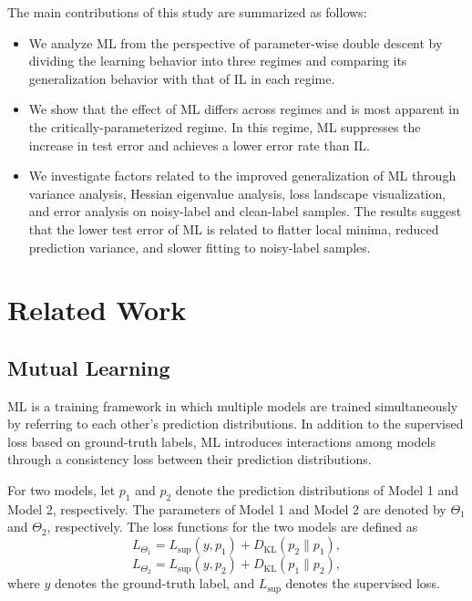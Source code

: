 \documentclass[dvipdfmx]{nolta}
\begin{document}
The main contributions of this study are summarized as follows:
\begin{itemize}
\item We analyze ML from the perspective of parameter-wise double descent by dividing the learning behavior into three regimes and comparing its generalization behavior with that of IL in each regime.

\item We show that the effect of ML differs across regimes and is most apparent in the critically-parameterized regime. In this regime, ML suppresses the increase in test error and achieves a lower error rate than IL.

\item We investigate factors related to the improved generalization of ML through variance analysis, Hessian eigenvalue analysis, loss landscape visualization, and error analysis on noisy-label and clean-label samples. The results suggest that the lower test error of ML is related to flatter local minima, reduced prediction variance, and slower fitting to noisy-label samples.
\end{itemize}

\section{Related Work}
\subsection{Mutual Learning}

ML is a training framework in which multiple models are trained simultaneously by referring to each other's prediction distributions. In addition to the supervised loss based on ground-truth labels, ML introduces interactions among models through a consistency loss between their prediction distributions.

For two models, let $p_1$ and $p_2$ denote the prediction distributions of Model 1 and Model 2, respectively.
The parameters of Model 1 and Model 2 are denoted by $\Theta_1$ and $\Theta_2$, respectively.
The loss functions for the two models are defined as
\begin{equation}
L_{\Theta_1} = L_{\mathrm{sup}}(y, p_1) + D_{\mathrm{KL}}(p_2 \| p_1),
\end{equation}
\begin{equation}
L_{\Theta_2} = L_{\mathrm{sup}}(y, p_2) + D_{\mathrm{KL}}(p_1 \| p_2),
\end{equation}
where $y$ denotes the ground-truth label, and $L_{\mathrm{sup}}$ denotes the supervised loss.
\end{document}
